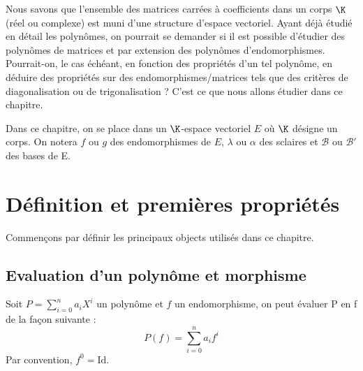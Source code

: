 

\justify 

\setlength{\parindent}{0pt}



\minitoc  %

Nous savons que l'ensemble des matrices carrées à coefficients dans un corps $\K$ (réel ou complexe) est 
muni d'une structure d'espace vectoriel. 
Ayant déjà étudié en détail les polynômes, on pourrait se demander si il est possible d'étudier des polynômes de matrices 
et par extension des polynômes d'endomorphismes. 
Pourrait-on, le cas échéant, en fonction des propriétés d'un tel polynôme, en déduire des propriétés sur des endomorphismes/matrices 
tels que des critères de diagonalisation ou de trigonalisation ?
C'est ce que nous allons étudier dans ce chapitre. 

\vspace{0.3cm}

Dans ce chapitre, on se place dans un $\K$-espace vectoriel $E$ où $\K$ désigne un corps. 
On notera $f$ ou $g$ des endomorphismes de $E$, $\lambda$ ou $\alpha$ des sclaires et $\mathcal{B}$ ou $\mathcal{B}'$ des bases de E. 




\section{Définition et premières propriétés}

Commençons par définir les principaux objects utilisés dans ce chapitre. 

\subsection{Evaluation d'un polynôme et morphisme}

\begin{definition}
    Soit $P = \sum_{i=0}^{n} a_i X^i$ un polynôme et $f$ un endomorphisme, on peut évaluer P en f de la façon suivante :
        \[ P(f) = \sum_{i=0}^{n} a_i f^i \]
    Par convention, $f^0 = \text{Id}$. 
\end{definition}

